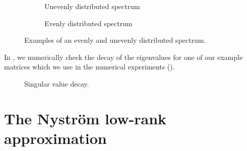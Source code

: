 \begin{figure}
    \centering
    \begin{subfigure}[t]{0.45\columnwidth}
        
        \caption{Unevenly distributed spectrum}
    \end{subfigure}
    \begin{subfigure}[t]{0.45\columnwidth}
        
        \caption{Evenly distributed spectrum}
    \end{subfigure}      
    \caption{Examples of an evenly and unevenly distributed spectrum.}
    \label{fig:3-nystrom-evenly-distributed-spectrum}
\end{figure}

In , we numerically check the decay
of the eigenvalues for one of our example matrices which we use in the numerical
experiments ().
\begin{figure}[ht]
    \centering
    
    \caption{Singular value decay. }
    \label{fig:3-nystrom-singular-value-decay}
\end{figure}


\section{The Nystr\"om low-rank approximation}
\label{sec:3-nystrom-nystrom}

